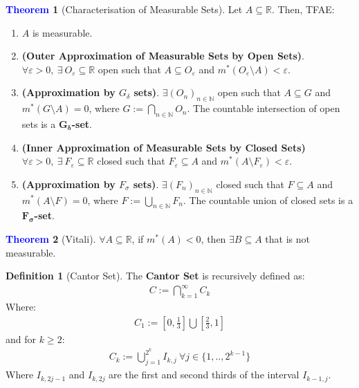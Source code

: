 \documentclass[reqno,11pt]{amsart}
\theoremstyle{definition}
\newtheorem{question}{Question}
\newcommand{\bb}[1]{\mathbb{#1}}
\newtheorem{theorem}{\textcolor{blue}{Theorem}}
\theoremstyle{definition}
\newtheorem{definition}{\textcolor{OliveGreen}{Definition}}
\theoremstyle{remark}
\begin{document}
\begin{theorem}[Characterisation of Measurable Sets] 
	Let $A \subseteq \bb{R}$. Then, TFAE: 
	\begin{enumerate}[nolistsep]
		\item $A$ is measurable. 
		\item \textbf{(Outer Approximation of Measurable Sets by Open Sets)}. $\forall \varepsilon > 0,\ \exists\ O_\varepsilon \subseteq \bb{R}$ open such that $A \subseteq O_\varepsilon$ and $m^*(O_\varepsilon \setminus A) < \varepsilon$. 
		\item \textbf{(Approximation by $G_\delta$ sets)}. $\exists (O_n)_{n \in \bb{N}}$ open such that $A \subseteq G$ and $m^*(G \setminus A) = 0$, where $G:= \bigcap_{n \in \bb{N}} O_n$. The countable intersection of open sets is a $\mathbf{G_\delta}$\textbf{-set}. 
		\item \textbf{(Inner Approximation of Measurable Sets by Closed Sets)} $\forall \varepsilon > 0,\ \exists\ F_\varepsilon \subseteq \bb{R}$ closed such that $F_\varepsilon \subseteq A$ and $m^*(A \setminus F_\varepsilon) < \varepsilon$. 
		\item \textbf{(Approximation by $F_\sigma$ sets)}. $\exists (F_n)_{n \in \bb{N}}$ closed such that $F \subseteq A$ and $m^*(A \setminus F) = 0$, where $F:= \bigcup_{n \in \bb{N}} F_n$. The countable union of closed sets is a $\mathbf{F_\sigma}$\textbf{-set}. 

	\end{enumerate}
\end{theorem}


\begin{theorem}[Vitali]
	$\forall A \subseteq \bb{R}$, if $m^*(A) < 0$, then $\exists B \subseteq A$ that is not measurable. 
\end{theorem}

\begin{definition}[Cantor Set]
	The \textbf{Cantor Set} is recursively defined as: 
	\begin{align}
		C := \bigcap_{k=1}^\infty C_k 
	\end{align}
	Where: 
	\begin{align*}
		C_1:= \left[ 0, \frac{1}{3}	\right] \bigcup \left[ 	\frac{2}{3}, 1 \right]
	\end{align*}
	and for $k \geq 2 $: 
	\begin{align*}
		C_k := \bigcup_{j=1}^{2^k} I_{k, j}\ \forall j \in \{ 1, .., 2^{k-1} \} 	
	\end{align*}
	Where $I_{k, 2j-1}$ and $I_{k, 2j}$ are the first and second thirds of the interval $I_{k-1, j}$. 

\end{definition}
\end{document}
